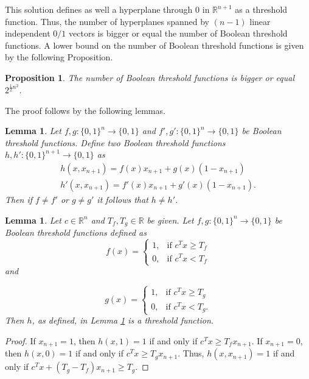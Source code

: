 \documentclass[11pt]{amsart}
\newtheorem{prop}[theorem]{Proposition}
\newtheorem{lem}[theorem]{Lemma}
\theoremstyle{definition}
\theoremstyle{definition}
\begin{document}
This solution defines as well a hyperplane through $0$ in $\mathbb{R}^{n+1}$ as a threshold function.  Thus, the number of hyperplanes spanned by $(n-1)$ linear independent $0/1$ vectors is bigger or equal the number of Boolean threshold functions. A lower bound on the number of Boolean threshold functions is given by the following Proposition. 

\begin{prop}
The number of Boolean threshold functions is bigger or equal $2^{\frac{1}{2}n^2}$. 
\end{prop}

The proof follows by the following lemmas.

\begin{lem} \label{lem1}
Let $f,g \colon \{0,1 \}^n \rightarrow \{0,1 \}$ and $f',g' \colon \{0,1 \}^n \rightarrow \{0,1 \}$ be Boolean threshold functions. Define two Boolean threshold functions $h,h' \colon \{0,1 \}^{n+1} \rightarrow \{0,1 \}$ as 
\begin{align*}
    h(x,x_{n+1}) = f(x)x_{n+1} + g(x)(1-x_{n+1}) \\
    h'(x,x_{n+1}) = f'(x)x_{n+1} + g'(x)(1-x_{n+1}).
\end{align*}
Then if $f\neq f' $ or $g \neq g'$ it follows that $h \neq h'$. 
\end{lem}

\begin{lem} \label{lem2}
Let $c \in \mathbb{R}^n$ and $T_f,T_g \in \mathbb{R}$ be given. 
Let $f,g \colon \{0,1 \}^n \rightarrow \{0,1 \}$ be Boolean threshold functions defined as
\begin{equation*}
  f(x)=\begin{cases}
    1, & \text{if $c^Tx \geq T_f$}\\
    0, & \text{if $c^Tx < T_f$}
  \end{cases}
\end{equation*} and 

\begin{equation*}
  g(x)=\begin{cases}
    1, & \text{if $c^Tx \geq T_g$}\\
    0, & \text{if $c^Tx < T_g$}.
  \end{cases}
\end{equation*}
Then $h$, as defined, in Lemma \ref{lem1} is a threshold function.

\end{lem}

\begin{proof}
If $x_{n+1} = 1$, then $h(x,1) = 1$ if and only if $c^Tx \geq T_fx_{n+1}$. If $x_{n+1} = 0$, then $h(x,0) = 1$ if and only if $c^Tx \geq T_gx_{n+1}$. Thus, $h(x,x_{n+1})=1$ if and only if $c^Tx+(T_g-T_f)x_{n+1} \geq T_g$. 
\end{proof}
\end{document}
